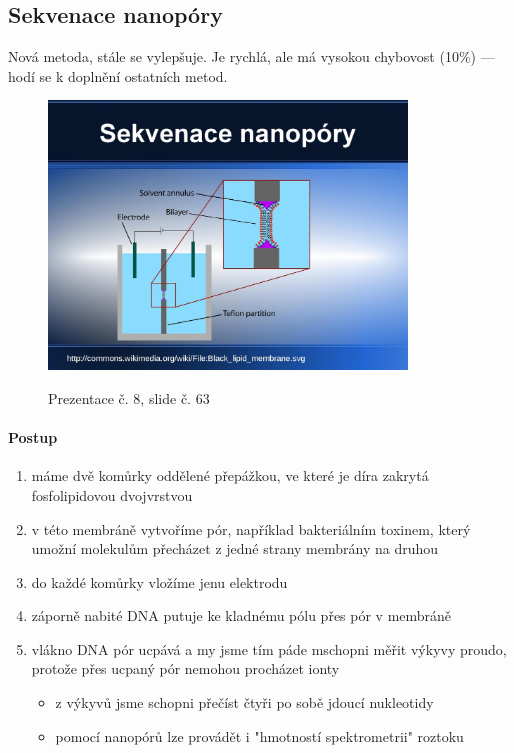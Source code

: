 \documentclass[DIV=8]{scrreprt}
\begin{document}
\subsection{Sekvenace nanopóry} \label{Sekvenace nanopóry}


Nová metoda, stále se vylepšuje. Je rychlá, ale má vysokou chybovost (10\%) --- hodí se k doplnění ostatních metod.

\begin{figure}
    \caption{Prezentace č. 8, slide č. 63}
    \includegraphics[width=0.85\textwidth]{slides-8/slide-63.jpg}
    \centering
    \label{slides-8-slide-63}
\end{figure}

\paragraph{Postup}
\begin{enumerate}[nosep]
    \item máme dvě komůrky oddělené přepážkou, ve které je díra zakrytá fosfolipidovou dvojvrstvou
    \item v této membráně vytvoříme pór, například bakteriálním toxinem, který umožní molekulům přecházet z jedné strany membrány na druhou
    \item do každé komůrky vložíme jenu elektrodu
    \item záporně nabité DNA putuje ke kladnému pólu přes pór v membráně
    \item vlákno DNA pór ucpává a my jsme tím páde mschopni měřit výkyvy proudo, protože přes ucpaný pór nemohou procházet ionty
\begin{itemize}[nosep]
    \item z výkyvů jsme schopni přečíst čtyři po sobě jdoucí nukleotidy
    \item pomocí nanopórů lze provádět i "hmotností spektrometrii" roztoku
\end{itemize}

\end{enumerate}
\end{document}
